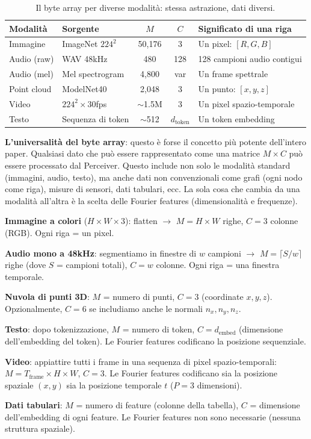 \documentclass[12pt,a4paper]{article}
\begin{document}
\begin{table}[htbp]
\centering
\caption{Il byte array per diverse modalit\`a: stessa astrazione, dati diversi.}
\begin{tabular}{@{}llccl@{}}
\toprule
\textbf{Modalit\`a} & \textbf{Sorgente} & $M$ & $C$ & \textbf{Significato di una riga} \\
\midrule
Immagine & ImageNet $224^2$ & 50{,}176 & 3 & Un pixel: $[R, G, B]$ \\
Audio (raw) & WAV 48kHz & 480 & 128 & 128 campioni audio contigui \\
Audio (mel) & Mel spectrogram & 4{,}800 & var & Un frame spettrale \\
Point cloud & ModelNet40 & 2{,}048 & 3 & Un punto: $[x, y, z]$ \\
Video & $224^2 \times 30$fps & $\sim$1.5M & 3 & Un pixel spazio-temporale \\
Testo & Sequenza di token & $\sim$512 & $d_{\text{token}}$ & Un token embedding \\
\bottomrule
\end{tabular}
\end{table}

\textbf{L'universalit\`a del byte array}: questo \`e forse il concetto pi\`u potente dell'intero paper. Qualsiasi dato che pu\`o essere rappresentato come una matrice $M \times C$ pu\`o essere processato dal Perceiver. Questo include non solo le modalit\`a standard (immagini, audio, testo), ma anche dati non convenzionali come grafi (ogni nodo come riga), misure di sensori, dati tabulari, ecc. La sola cosa che cambia da una modalit\`a all'altra \`e la scelta delle Fourier features (dimensionalit\`a e frequenze).

\begin{examplebox}

\textbf{Immagine a colori} ($H \times W \times 3$): flatten $\to$ $M = H \times W$ righe, $C = 3$ colonne (RGB). Ogni riga = un pixel.

\textbf{Audio mono a 48kHz}: segmentiamo in finestre di $w$ campioni $\to$ $M = \lceil S / w \rceil$ righe (dove $S$ = campioni totali), $C = w$ colonne. Ogni riga = una finestra temporale.

\textbf{Nuvola di punti 3D}: $M$ = numero di punti, $C = 3$ (coordinate $x, y, z$). Opzionalmente, $C = 6$ se includiamo anche le normali $n_x, n_y, n_z$.

\textbf{Testo}: dopo tokenizzazione, $M$ = numero di token, $C = d_{\text{embed}}$ (dimensione dell'embedding del token). Le Fourier features codificano la posizione sequenziale.

\textbf{Video}: appiattire tutti i frame in una sequenza di pixel spazio-temporali: $M = T_{\text{frame}} \times H \times W$, $C = 3$. Le Fourier features codificano sia la posizione spaziale $(x, y)$ sia la posizione temporale $t$ ($P = 3$ dimensioni).

\textbf{Dati tabulari}: $M$ = numero di feature (colonne della tabella), $C$ = dimensione dell'embedding di ogni feature. Le Fourier features non sono necessarie (nessuna struttura spaziale).
\end{examplebox}
\end{document}
